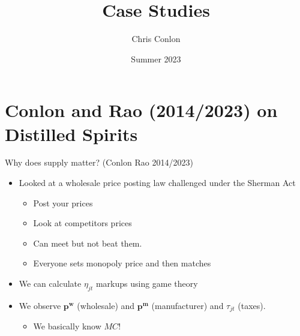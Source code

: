\documentclass[aspectratio=169,10pt]{beamer}
\title{Case Studies}
\author{Chris Conlon}
\institute{NYU Stern and NBER}
\date{Summer 2023}
\begin{document}
\begin{frame}[plain] %
\titlepage
\end{frame}



\section*{Conlon and Rao (2014/2023) on Distilled Spirits}



\begin{frame}{Why does supply matter? (Conlon Rao 2014/2023)}
\begin{itemize}
\item Looked at a wholesale price posting law challenged under the Sherman Act
\begin{itemize}
\item Post your prices
\item Look at competitors prices
\item Can meet but not beat them.
\item \textrightarrow Everyone sets monopoly price and then matches
\end{itemize}
\item We can calculate $\eta_{jt}$ markups using game theory
\item We observe $\symbf{p^w}$ (wholesale) and $\symbf{p^m}$ (manufacturer) and $\tau_{jt}$ (taxes).
\begin{itemize}
\item We basically know $MC$!
\end{itemize}
\end{itemize}
\end{frame}
\end{document}
